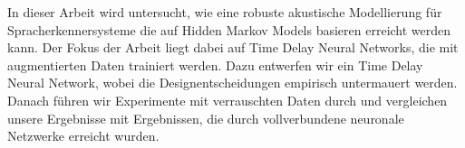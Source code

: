 
\Abstract
In dieser Arbeit wird untersucht, wie eine robuste akustische Modellierung für Spracherkennersysteme die auf Hidden Markov Models basieren erreicht werden kann. Der Fokus der Arbeit liegt dabei auf Time Delay Neural Networks, die mit augmentierten Daten trainiert werden. Dazu entwerfen wir ein Time Delay Neural Network, wobei die Designentscheidungen empirisch untermauert werden. Danach führen wir Experimente mit verrauschten Daten durch und vergleichen unsere Ergebnisse mit Ergebnissen, die durch vollverbundene neuronale Netzwerke erreicht wurden. 